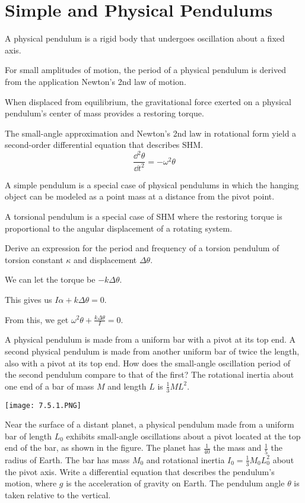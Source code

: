 \documentclass[../mech.tex]{subfiles}
\begin{document}
\section{Simple and Physical Pendulums}
A physical pendulum is a rigid body that undergoes oscillation about a fixed axis.

For small amplitudes of motion, the period of a physical pendulum is derived from the application Newton's 2nd law of motion.

When displaced from equilibrium, the gravitational force exerted on a physical pendulum's center of mass provides a restoring torque.

The small-angle approximation and Newton's 2nd law in rotational form yield a second-order differential equation that describes SHM. 
\[ \frac{\dd^2 \theta}{\dd t^2}=-\omega^2\theta \]

A simple pendulum is a special case of physical pendulums in which the hanging object can be modeled as a point mass at a distance from the pivot point.

A torsional pendulum is a special case of SHM where the restoring torque is proportional to the angular displacement of a rotating system.

\begin{example}
    Derive an expression for the period and frequency of a torsion pendulum of torsion constant $\kappa$ and displacement $\Delta \theta$.

    We can let the torque be $-k\Delta \theta$.

    This gives us $I\alpha + k\Delta \theta = 0$.

    From this, we get $\omega^2 \theta + \frac{k\Delta \theta}{I}=0$.
\end{example}

\ex A physical pendulum is made from a uniform bar with a pivot at its top end. A second physical pendulum is made from another uniform bar of twice the length, also with a pivot at its top end. How does the small-angle oscillation period of the second pendulum compare to that of the first?
The rotational inertia about one end of a bar of mass $M$ and length $L$ is $\frac{1}{3}ML^2$.


\ex \begin{center}
    \texttt{[image: 7.5.1.PNG]}
\end{center}
Near the surface of a distant planet, a physical pendulum made from a uniform bar of length $L_0$ exhibits small-angle oscillations about a pivot located at the top end of the bar, as shown in the figure.
The planet has $\frac{1}{40}$ the mass and $\frac{1}{5}$ the radius of Earth. The bar has mass $M_0$ and rotational inertia $I_0=\frac{1}{3}M_0L_0^2$ about the pivot axis. Write a differential equation that describes 
the pendulum's motion, where $g$ is the acceleration of gravity on Earth. The pendulum angle $\theta$ is taken relative to the vertical.
\end{document}
